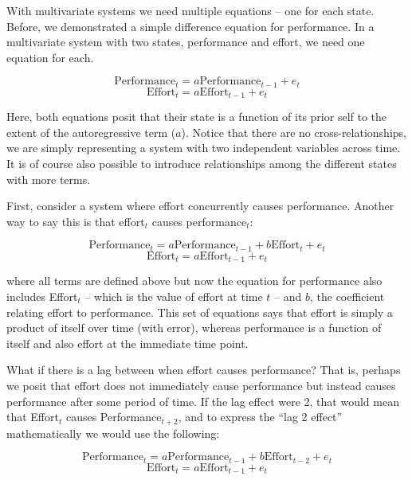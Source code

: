 \documentclass[english,,man]{apa6}
\theoremstyle{definition}
\theoremstyle{definition}
\theoremstyle{definition}
\theoremstyle{remark}
\begin{document}
With multivariate systems we need multiple equations -- one for each
state. Before, we demonstrated a simple difference equation for
performance. In a multivariate system with two states, performance and
effort, we need one equation for each.

\begin{equation}
\label{sysy}
\textrm{Performance}_{t} = a \textrm{Performance}_{t - 1} + e_{t}
\end{equation} \begin{equation}
\label{sysx}
\textrm{Effort}_{t} = a \textrm{Effort}_{t - 1} + e_{t}
\end{equation}

\noindent Here, both equations posit that their state is a function of
its prior self to the extent of the autoregressive term (\(a\)). Notice
that there are no cross-relationships, we are simply representing a
system with two independent variables across time. It is of course also
possible to introduce relationships among the different states with more
terms.

First, consider a system where effort concurrently causes performance.
Another way to say this is that effort\(_t\) causes performance\(_t\):

\begin{equation}
\label{sysy2}
\textrm{Performance}_{t} = a \textrm{Performance}_{t - 1} + b \textrm{Effort}_{t} + e_{t}
\end{equation} \begin{equation}
\label{sysx2}
\textrm{Effort}_{t} = a \textrm{Effort}_{t - 1} + e_{t}
\end{equation}

\noindent where all terms are defined above but now the equation for
performance also includes Effort\(_t\) -- which is the value of effort
at time \(t\) -- and \(b\), the coefficient relating effort to
performance. This set of equations says that effort is simply a product
of itself over time (with error), whereas performance is a function of
itself and also effort at the immediate time point.

What if there is a lag between when effort causes performance? That is,
perhaps we posit that effort does not immediately cause performance but
instead causes performance after some period of time. If the lag effect
were 2, that would mean that Effort\(_t\) causes Performance\(_{t+2}\),
and to express the \enquote{lag 2 effect} mathematically we would use
the following:

\begin{equation}
\label{sysy3}
\textrm{Performance}_{t} = a \textrm{Performance}_{t - 1} + b \textrm{Effort}_{t - 2} + e_{t}
\end{equation} \begin{equation}
\label{sysx3}
\textrm{Effort}_{t} = a \textrm{Effort}_{t - 1} + e_{t}
\end{equation}
\end{document}
